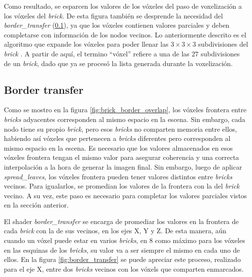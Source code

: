 Como resultado, se esparcen los valores de los vóxeles del paso de voxelización a los vóxeles del \textit{brick}.
De esta figura también se desprende la necesidad del \textit{border\_transfer} (\ref{sec:border_transfer}), ya que los vóxeles contienen valores parciales y deben completarse con información de los nodos vecinos.
Lo anteriormente descrito es el algoritmo que expande los vóxeles para poder llenar las $3\times3\times3$ subdivisiones del \textit{brick} .
A partir de aquí, el termino ``vóxel'' refiere a una de las $27$ subdivisiones de un \textit{brick}, dado que ya se procesó la lista generada durante la voxelización.

\subsection{Border transfer}\label{sec:border_transfer}

Como se mostro en la figura \ref{fig:brick_border_overlap}, los vóxeles frontera entre \textit{bricks} adyacentes corresponden al mismo espacio en la escena.
Sin embargo, cada nodo tiene su propio \textit{brick}, pero esos \textit{bricks} no comparten memoria entre ellos, habiendo así vóxeles que pertenecen a \textit{bricks} diferentes pero corresponden al mismo espacio en la escena.
Es necesario que los valores almacenados en esos vóxeles frontera tengan el mismo valor para asegurar coherencia y una correcta interpolación a la hora de generar la imagen final.
Sin embargo, luego de aplicar \textit{spread\_leaves}, los vóxeles frontera pueden tener valores distintos entre \textit{bricks} vecinos.
Para igualarlos, se promedian los valores de la frontera con la del \textit{brick} vecino.
A su vez, este paso es necesario para completar los valores parciales vistos en la sección anterior.

El shader \textit{border\_transfer} se encarga de promediar los valores en la frontera de cada \textit{brick} con la de sus vecinos, en los ejes X, Y y Z.
De esta manera, aún cuando un vóxel puede estar en varios \textit{bricks}, en $8$ como máximo para los vóxeles en las esquinas de los \textit{bricks}, su valor va a ser siempre el mismo en cada uno de ellos. %
En la figura \ref{fig:border_transfer} se puede apreciar este proceso, realizado para el eje X, entre dos \textit{bricks} vecinos con los vóxels que comparten enmarcados.

